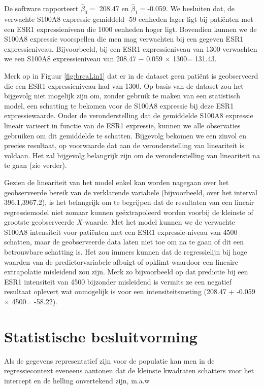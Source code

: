\documentclass[
  12pt,dutch,coursenotes]{book}
\theoremstyle{definition}
\theoremstyle{definition}
\theoremstyle{definition}
\theoremstyle{remark}
\begin{document}
De software rapporteert \(\hat{\beta}_0=\) 208.47 en \(\hat{\beta}_1=\)-0.059. We besluiten dat, de verwachte S100A8 expressie gemiddeld -59 eenheden lager ligt bij patiënten met een ESR1 expressieniveau die 1000 eenheden hoger ligt.
Bovendien kunnen we de S100A8 expressie voorspellen die men mag verwachten bij een gegeven ESR1 expressieniveau. Bijvoorbeeld, bij een ESR1 expressieniveau van 1300 verwachten we een S100A8 expressieniveau van 208.47 \(-\) 0.059 \(\times\) 1300= 131.43.

Merk op in Figuur \ref{fig:brcaLin1} dat er in de dataset geen patiënt is geobserveerd die een ESR1 expressieniveau had van 1300. Op basis van de dataset zou het bijgevolg niet mogelijk zijn om, zonder gebruik te maken van een statistisch model, een schatting te bekomen voor de S100A8 expressie bij deze ESR1 expressiewaarde. Onder de veronderstelling dat de gemiddelde S100A8 expressie lineair varieert in functie van de ESR1 expressie, kunnen we alle observaties gebruiken om dit gemiddelde te schatten. Bijgevolg bekomen we een zinvol en precies resultaat, op voorwaarde dat aan de veronderstelling van lineariteit is voldaan. Het zal bijgevolg belangrijk zijn om de veronderstelling van lineariteit na te gaan (zie verder).

Gezien de lineariteit van het model enkel kan worden nagegaan over het
geobserveerde bereik van de verklarende variabele (bijvoorbeeld, over het
interval 396.1,3967.2), is het belangrijk om te begrijpen dat de resultaten van een lineair regressiemodel niet zomaar kunnen geëxtrapoleerd worden
voorbij de kleinste of grootste geobserveerde \(X\)-waarde.
Met het model kunnen we de verwachte S100A8 intensiteit voor patiënten met een
ESR1 expressie-niveau van 4500 schatten, maar de geobserveerde data laten niet toe om na te gaan of dit een
betrouwbare schatting is. Het zou immers kunnen dat de regressielijn bij hoge waarden van de predictorvariabele
afbuigt of opklimt waardoor een lineaire extrapolatie misleidend zou zijn.
Merk zo bijvoorbeeld op dat predictie bij een ESR1 intensiteit van 4500 bijzonder misleidend is vermits ze een negatief resultaat oplevert wat onmogelijk is voor een intensiteitsmeting (208.47 \(+\) -0.059 \(\times\) 4500= -58.22).

\hypertarget{sec:linBesluit}{%
\section{Statistische besluitvorming}\label{sec:linBesluit}}

Als de gegevens representatief zijn voor de populatie kan men in de regressiecontext eveneens aantonen dat de kleinste kwadraten schatters voor het intercept en de helling onvertekend zijn, m.a.w
\end{document}
